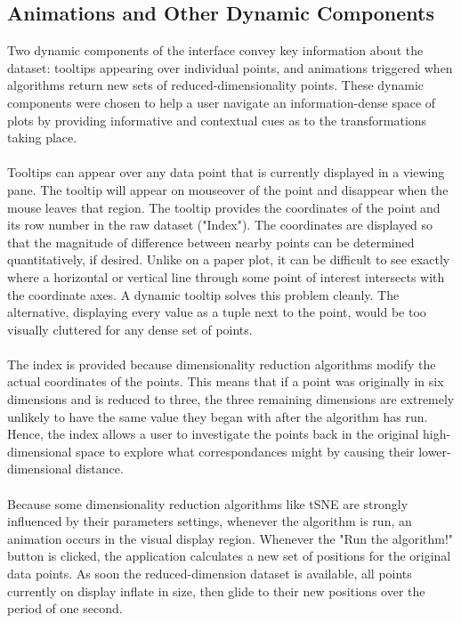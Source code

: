 \documentclass{sigchi}
\begin{document}
\subsection{Animations and Other Dynamic Components}
%
Two dynamic components of the interface convey key information about the dataset: tooltips appearing over individual points, and animations triggered when algorithms return new sets of reduced-dimensionality points. %
%
These dynamic components were chosen to help a user navigate an information-dense space of plots by providing informative and contextual cues as to the transformations taking place. %
%
\\\\
%
Tooltips can appear over any data point that is currently displayed in a viewing pane. %
%
The tooltip will appear on mouseover of the point and disappear when the mouse leaves that region. %
%
The tooltip provides the coordinates of the point and its row number in the raw dataset ("Index"). %
%
The coordinates are displayed so that the magnitude of difference between nearby points can be determined quantitatively, if desired. %
%
Unlike on a paper plot, it can be difficult to see exactly where a horizontal or vertical line through some point of interest intersects with the coordinate axes. %
%
A dynamic tooltip solves this problem cleanly. %
%
The alternative, displaying every value as a tuple next to the point, would be too visually cluttered for any dense set of points. %
%
\\\\
%
The index is provided because dimensionality reduction algorithms modify the actual coordinates of the points. %
%
This means that if a point was originally in six dimensions and is reduced to three, the three remaining dimensions are extremely unlikely to have the same value they began with after the algorithm has run. %
%
Hence, the index allows a user to investigate the points back in the original high-dimensional space to explore what correspondances might by causing their lower-dimensional distance. %
\\\\
%
Because some dimensionality reduction algorithms like tSNE are strongly influenced by their parameters settings, whenever the algorithm is run, an animation occurs in the visual display region. %
%
Whenever the "Run the algorithm!" button is clicked, the application calculates a new set of positions for the original data points. %
%
As soon the reduced-dimension dataset is available, all points currently on display inflate in size, then glide to their new positions over the period of one second.
\end{document}
